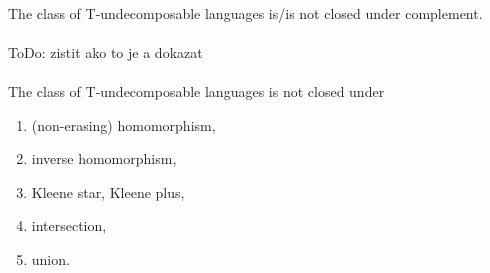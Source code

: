 \paragraph{}
\cveta The class of T-undecomposable languages is/is not closed under complement.

\paragraph{}
\dokaz \color{red}ToDo: zistit ako to je a dokazat\color{black}\\
\square

\paragraph{}
\cveta The class of T-undecomposable languages is not closed under 
\begin{enumerate}
\item (non-erasing) homomorphism,
\item inverse homomorphism,
\item Kleene star, Kleene plus,
\item intersection,
\item union.
\end{enumerate}

